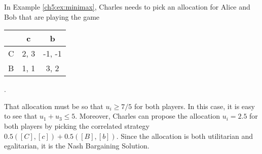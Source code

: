 \begin{example}
\label{example:AliceBobCinemaBargain}
In Example  \ref{ch5:ex:minimax}, Charles needs to pick an allocation for Alice and Bob that are playing the game
\begin{center}
\begin{tabular}{c | c  c}
& c & b\\
\hline
C & 2, 3 & -1, -1  \\
B & 1, 1 & 3, 2
\end{tabular}
.
\end{center}
That allocation must be so that $u_i \geq 7/5$ for both players.
In this case, it is easy to see that $u_1 + u_3 \leq 5$. Moreover, Charles can propose the allocation $u_i = 2.5$ for both players by picking the correlated strategy $0.5([C],[c]) + 0.5([B],[b])$.
Since the allocation is both utilitarian and egalitarian, it is the Nash Bargaining Solution.
\end{example}
